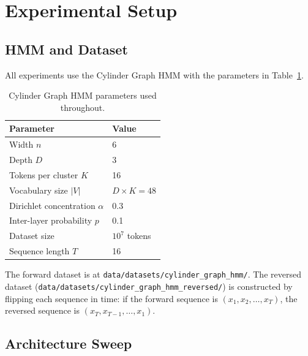 \documentclass[11pt]{article}
\begin{document}
\section{Experimental Setup}\label{sec:setup}

\subsection{HMM and Dataset}

All experiments use the Cylinder Graph HMM with the parameters in Table~\ref{tab:hmm-params}.

\begin{table}[htbp]
  \centering
  \begin{tabular}{ll}
    \toprule
    Parameter & Value \\
    \midrule
    Width $n$                     & 6 \\
    Depth $D$                     & 3 \\
    Tokens per cluster $K$        & 16 \\
    Vocabulary size $|V|$         & $D \times K = 48$ \\
    Dirichlet concentration $\alpha$ & 0.3 \\
    Inter-layer probability $p$   & 0.1 \\
    Dataset size                  & $10^7$ tokens \\
    Sequence length $T$           & 16 \\
    \bottomrule
  \end{tabular}
  \caption{Cylinder Graph HMM parameters used throughout.}
  \label{tab:hmm-params}
\end{table}

The forward dataset is at \texttt{data/datasets/cylinder\_graph\_hmm/}.  The reversed dataset (\texttt{data/datasets/cylinder\_graph\_hmm\_reversed/}) is constructed by flipping each sequence in time: if the forward sequence is $(x_1, x_2, \ldots, x_T)$, the reversed sequence is $(x_T, x_{T-1}, \ldots, x_1)$.

\subsection{Architecture Sweep}
\end{document}

